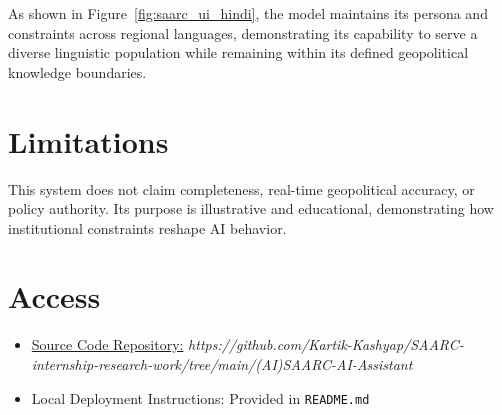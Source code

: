 \documentclass[12pt,a4paper]{report}
\begin{document}
As shown in Figure~\ref{fig:saarc_ui_hindi}, the model maintains its persona and constraints across regional languages, demonstrating its capability to serve a diverse linguistic population while remaining within its defined geopolitical knowledge boundaries.

\section{Limitations}
This system does not claim completeness, real-time geopolitical accuracy, or policy authority. Its purpose is illustrative and educational, demonstrating how institutional constraints reshape AI behavior.

\section{Access}

\begin{itemize}
    \item \href{https://github.com/Kartik-Kashyap/SAARC-internship-research-work/tree/main/(AI)SAARC-AI-Assistant}{Source Code Repository:} \textit{https://github.com/Kartik-Kashyap/SAARC-internship-research-work/tree/main/(AI)SAARC-AI-Assistant}
    \item Local Deployment Instructions: Provided in \texttt{README.md}
\end{itemize}


\newpage
\nocite{*}
% 
% 
\printbibliography[title={References}]
\end{document}
